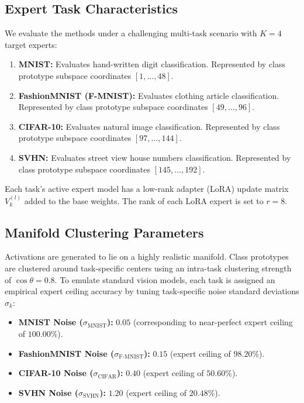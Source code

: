 \documentclass{article}
\theoremstyle{plain}
\theoremstyle{definition}
\theoremstyle{remark}
\begin{document}
\subsection{Expert Task Characteristics}
We evaluate the methods under a challenging multi-task scenario with $K = 4$ target experts:
\begin{enumerate}
    \item \textbf{MNIST:} Evaluates hand-written digit classification. Represented by class prototype subspace coordinates $[1, \dots, 48]$.
    \item \textbf{FashionMNIST (F-MNIST):} Evaluates clothing article classification. Represented by class prototype subspace coordinates $[49, \dots, 96]$.
    \item \textbf{CIFAR-10:} Evaluates natural image classification. Represented by class prototype subspace coordinates $[97, \dots, 144]$.
    \item \textbf{SVHN:} Evaluates street view house numbers classification. Represented by class prototype subspace coordinates $[145, \dots, 192]$.
\end{enumerate}

Each task's active expert model has a low-rank adapter (LoRA) update matrix $V_k^{(l)}$ added to the base weights. The rank of each LoRA expert is set to $r = 8$.

\subsection{Manifold Clustering Parameters}
Activations are generated to lie on a highly realistic manifold.
Class prototypes are clustered around task-specific centers using an intra-task clustering strength of $\cos\theta = 0.8$.
To emulate standard vision models, each task is assigned an empirical expert ceiling accuracy by tuning task-specific noise standard deviations $\sigma_k$:
\begin{itemize}
    \item \textbf{MNIST Noise ($\sigma_{\text{MNIST}}$):} $0.05$ (corresponding to near-perfect expert ceiling of $100.00\%$).
    \item \textbf{FashionMNIST Noise ($\sigma_{\text{F-MNIST}}$):} $0.15$ (expert ceiling of $98.20\%$).
    \item \textbf{CIFAR-10 Noise ($\sigma_{\text{CIFAR}}$):} $0.40$ (expert ceiling of $50.60\%$).
    \item \textbf{SVHN Noise ($\sigma_{\text{SVHN}}$):} $1.20$ (expert ceiling of $20.48\%$).
\end{itemize}
\end{document}
